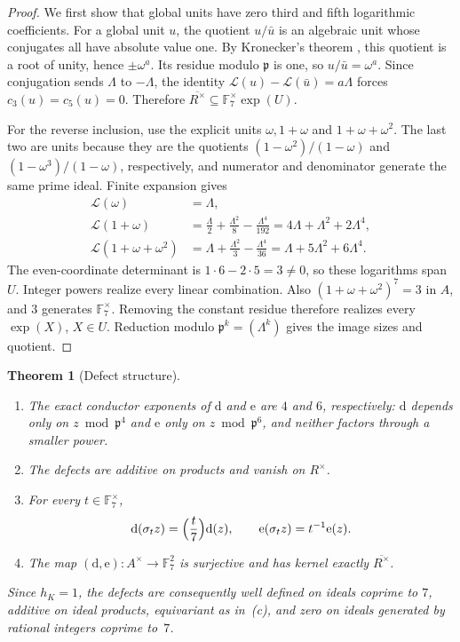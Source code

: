 \documentclass[11pt]{amsart}
\theoremstyle{plain}
\newtheorem{theorem}{Theorem}[section]
\theoremstyle{definition}
\numberwithin{equation}{section}
\newcommand{\F}{\mathbb F}
\newcommand{\pp}{\mathfrak p}
\newcommand{\dd}{\mathrm d}
\newcommand{\ee}{\mathrm e}
\begin{document}
\begin{proof}
We first show that global units have zero third and fifth
logarithmic coefficients.
For a global unit $u$, the quotient $u/\bar u$ is an algebraic
unit whose conjugates all have absolute value one.
By Kronecker's theorem
\cite[Chapter~I, Proposition~7.1]{Neukirch1999}, this quotient is a
root of unity, hence $\pm\omega^a$. Its residue modulo $\pp$
is one, so $u/\bar u=\omega^a$. Since conjugation sends
$\Lambda$ to $-\Lambda$, the identity
$\mathcal L(u)-\mathcal L(\bar u)=a\Lambda$ forces $c_3(u)=c_5(u)=0$.
Therefore $\overline{R^\times}\subseteq\F_7^\times\exp(U)$.

For the reverse inclusion, use the explicit units
$\omega,1+\omega$ and $1+\omega+\omega^2$. The last two are units
because they are the quotients $(1-\omega^2)/(1-\omega)$ and
$(1-\omega^3)/(1-\omega)$, respectively, and numerator and denominator
generate the same prime ideal. Finite expansion gives
\begin{align*}
 \mathcal L(\omega)&=\Lambda,\\
 \mathcal L(1+\omega)
   &=\frac{\Lambda}{2}+\frac{\Lambda^2}{8}
                   -\frac{\Lambda^4}{192}
     =4\Lambda+\Lambda^2+2\Lambda^4,\\
 \mathcal L(1+\omega+\omega^2)
   &=\Lambda+\frac{\Lambda^2}{3}-\frac{\Lambda^4}{36}
     =\Lambda+5\Lambda^2+6\Lambda^4.
\end{align*}
The even-coordinate determinant is $1\cdot6-2\cdot5=3\ne0$, so
these logarithms span $U$. Integer powers realize every linear
combination. Also $(1+\omega+\omega^2)^7=3$ in $A$, and $3$
generates $\F_7^\times$. Removing the constant residue therefore
realizes every $\exp(X)$, $X\in U$. Reduction modulo
$\pp^k=(\Lambda^k)$ gives the image sizes and quotient.
\end{proof}

\begin{theorem}[Defect structure]\label{thm:de-props}
\begin{enumerate}
\item[(a)] The exact conductor exponents of $\dd$ and $\ee$ are $4$ and
$6$, respectively: $\dd$ depends only on $z\bmod\pp^4$ and $\ee$ only
on $z\bmod\pp^6$, and neither factors through a smaller power.
\item[(b)] The defects are additive on products and vanish on $R^\times$.
\item[(c)] For every $t\in\F_7^\times$,
\[
 \dd(\sigma_tz)=\Bigl(\frac{t}{7}\Bigr)\dd(z),\qquad
 \ee(\sigma_tz)=t^{-1}\ee(z).
\]
\item[(d)] The map $(\dd,\ee)\colon A^\times\to\F_7^2$ is surjective and
has kernel exactly $\overline{R^\times}$.
\end{enumerate}
Since $h_K=1$, the defects are consequently well defined on ideals
coprime to $7$, additive on ideal products, equivariant as in~(c), and
zero on ideals generated by rational integers coprime to~$7$.
\end{theorem}
\end{document}
